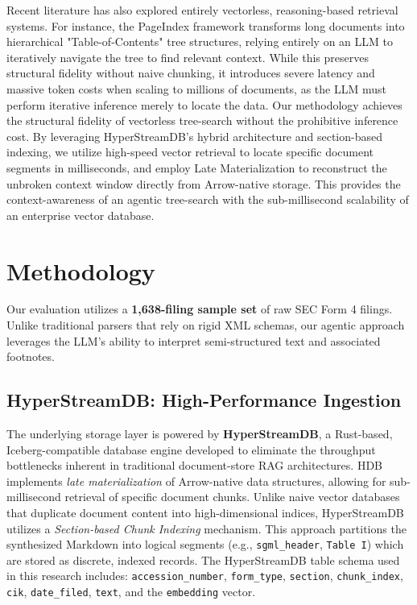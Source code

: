 \documentclass[journal, onecolumn]{IEEEtran}
\begin{document}
Recent literature has also explored entirely vectorless, reasoning-based retrieval systems. For instance, the PageIndex framework \cite{zhang2025pageindex} transforms long documents into hierarchical "Table-of-Contents" tree structures, relying entirely on an LLM to iteratively navigate the tree to find relevant context. While this preserves structural fidelity without naive chunking, it introduces severe latency and massive token costs when scaling to millions of documents, as the LLM must perform iterative inference merely to locate the data. Our methodology achieves the structural fidelity of vectorless tree-search without the prohibitive inference cost. By leveraging HyperStreamDB's hybrid architecture and section-based indexing, we utilize high-speed vector retrieval to locate specific document segments in milliseconds, and employ Late Materialization to reconstruct the unbroken context window directly from Arrow-native storage. This provides the context-awareness of an agentic tree-search with the sub-millisecond scalability of an enterprise vector database.

\section{Methodology}
Our evaluation utilizes a \textbf{1,638-filing sample set} of raw SEC Form 4 filings. Unlike traditional parsers that rely on rigid XML schemas, our agentic approach leverages the LLM's ability to interpret semi-structured text and associated footnotes.

\subsection{HyperStreamDB: High-Performance Ingestion}
The underlying storage layer is powered by \textbf{HyperStreamDB}, a Rust-based, Iceberg-compatible database engine developed to eliminate the throughput bottlenecks inherent in traditional document-store RAG architectures. HDB implements \textit{late materialization} of Arrow-native data structures, allowing for sub-millisecond retrieval of specific document chunks. Unlike naive vector databases that duplicate document content into high-dimensional indices, HyperStreamDB utilizes a \textit{Section-based Chunk Indexing} mechanism. This approach partitions the synthesized Markdown into logical segments (e.g., \texttt{sgml\_header}, \texttt{Table I}) which are stored as discrete, indexed records. The HyperStreamDB table schema used in this research includes: \texttt{accession\_number}, \texttt{form\_type}, \texttt{section}, \texttt{chunk\_index}, \texttt{cik}, \texttt{date\_filed}, \texttt{text}, and the \texttt{embedding} vector.
\end{document}
